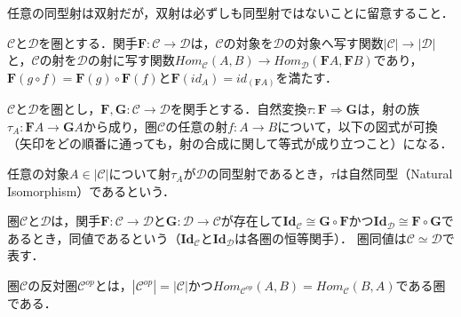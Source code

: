 \documentclass[type_judgement.tex]{subfiles}
\begin{document}
\begin{defn}[Category（圏）]
任意の同型射は双射だが，双射は必ずしも同型射ではないことに留意すること．

\begin{defn}[Functor（関手）]
$\mathcal{C}$と$\mathcal{D}$を圏とする．関手$\mathbf{F}:\mathcal{C} \rightarrow \mathcal{D}$は，$\mathcal{C}$の対象を$\mathcal{D}$の対象へ写す関数$|\mathcal{C}| \rightarrow |\mathcal{D}|$と，$\mathcal{C}$の射を$\mathcal{D}$の射に写す関数$Hom_\mathcal{C}(A,B) \rightarrow Hom_\mathcal{D}(\mathbf{F}A,\mathbf{F}B)$であり，
$\mathbf{F}(g \circ f) = \mathbf{F}(g) \circ \mathbf{F}(f)$と$\mathbf{F}(id_A) = id_{(\mathbf{F}A)}$を満たす．
\end{defn}



\begin{defn}
$\mathcal{C}$と$\mathcal{D}$を圏とし，$\mathbf{F},\mathbf{G}:\mathcal{C} \rightarrow \mathcal{D}$を関手とする．自然変換$\tau:\mathbf{F} \Rightarrow \mathbf{G}$は，射の族$\tau_A:\mathbf{F}A \rightarrow \mathbf{G}A$から成り，圏$\mathcal{C}$の任意の射$f:A \rightarrow B$について，以下の図式が可換（矢印をどの順番に通っても，射の合成に関して等式が成り立つこと）になる．
\begin{center}
\end{center}
任意の対象$A\in|\mathcal{C}|$について射$\tau_A$が$\mathcal{D}$の同型射であるとき，$\tau$は自然同型（Natural Isomorphism）であるという．
\end{defn}

\begin{defn}
圏$\mathcal{C}$と$\mathcal{D}$は，関手$\mathbf{F}:\mathcal{C} \rightarrow \mathcal{D}$と$\mathbf{G}:\mathcal{D} \rightarrow \mathcal{C}$が存在して$\mathbf{Id}_\mathcal{C} \cong \mathbf{G}\circ\mathbf{F}$かつ$\mathbf{Id}_\mathcal{D} \cong \mathbf{F}\circ\mathbf{G}$であるとき，同値であるという（$\mathbf{Id}_\mathcal{C}$と$\mathbf{Id}_\mathcal{D}$は各圏の恒等関手）．
圏同値は$\mathcal{C} \simeq \mathcal{D}$で表す．
\end{defn}

\begin{defn}
圏$\mathcal{C}$の反対圏$\mathcal{C}^{op}$とは，$|\mathcal{C}^{op}| = |\mathcal{C}|$かつ$Hom_{\mathcal{C}^{op}}(A,B) = Hom_\mathcal{C}(B,A)$である圏である．
\end{defn}


\end{defn}
\end{document}
